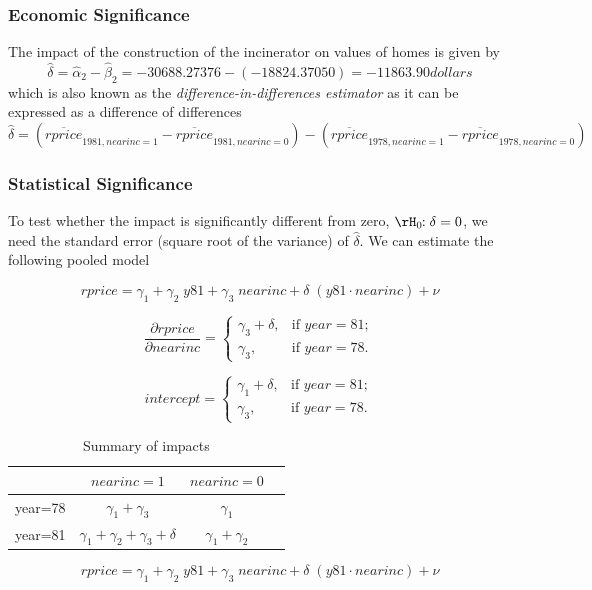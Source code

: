 \documentclass[landscape,letterpaper,9pt]{article}
\begin{document}
\subsubsection{Economic Significance}
The impact of the construction of the incinerator on values of homes is given by
\[\widehat{ \delta} = \widehat{\alpha}_2-\widehat{\beta}_2 = -30688.27376  - (-18824.37050 ) = -11863.90 dollars\]
which is also known as the \emph{difference-in-differences estimator} as it can be expressed as
a difference of differences
\[
\widehat{\delta} =
\left( \overline{rprice}_{1981,nearinc=1} - \overline{rprice}_{1981,nearinc=0} \right) -
\left( \overline{rprice}_{1978,nearinc=1} - \overline{rprice}_{1978,nearinc=0} \right)
\]

\newpage
\subsubsection{Statistical Significance}
To test whether the impact is significantly different from zero, \(\rH_0\!\!: \delta =0\),  we need the standard
error (square root of the variance)
 of \(\widehat{\delta}\).
%
%
We can estimate the following pooled model

\[ rprice = \gamma_1 + \gamma_2 \; y81 + \gamma_3 \; nearinc  + \delta  \; (y81 \cdot nearinc) + \nu \]

\[\frac{\partial rprice}{\partial  nearinc} =
\begin{cases}
    \gamma_3 + \delta , &\text{if $year=81$}; \\
     \gamma_3 , &\text{if $year=78$}.
\end{cases}
\]

\[intercept =
\begin{cases}
    \gamma_1 + \delta , &\text{if $year=81$}; \\
     \gamma_3 , &\text{if $year=78$}.
\end{cases}
\]



\begin{table}[h!]\caption{Summary of impacts}\label{tab:imp}
     \begin{center}
        \begin{tabular}{|c|c|c|c}\hline
             & $nearinc=1$           & $nearinc=0$ \\ \hline
     year=78 & $\gamma_1+\gamma_3$ & $\gamma_1$ \\ \hline
     year=81 & $\gamma_1+\gamma_2 +\gamma_3 + \delta$ & $\gamma_1 + \gamma_2$ \\
    \hline
\end{tabular} \vspace{-.2in}
\end{center}
\end{table}
\newpage
\[ rprice = \gamma_1 + \gamma_2 \; y81 + \gamma_3 \; nearinc  + \delta  \; (y81 \cdot nearinc) + \nu \]
\end{document}
